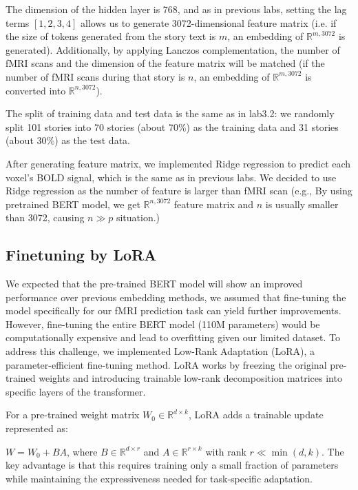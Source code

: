 \documentclass[12pt,letterpaper]{article}
\begin{document}
The dimension of the hidden layer is 768, and as in previous labs, setting the lag terms $[1,2,3,4]$ allows us to generate 3072-dimensional feature matrix (i.e. if the size of tokens generated from the story text is $m$, an embedding of $\mathbb{R}^{m, 3072}$ is generated). Additionally, by applying Lanczos complementation, the number of fMRI scans and the dimension of the feature matrix will be matched (if the number of fMRI scans during that story is $n$, an embedding of $\mathbb{R}^{m, 3072}$ is converted into $\mathbb{R}^{n, 3072}$).

The split of training data and test data is the same as in lab3.2: we randomly split 101 stories into 70 stories (about 70\%) as the training data and 31 stories (about 30\%) as the test data.

After generating feature matrix, we implemented Ridge regression to predict each voxel's BOLD signal, which is the same as in previous labs. We decided to use Ridge regression as the number of feature is larger than fMRI scan (e.g., By using pretrained BERT model, we get $\mathbb{R}^{n, 3072}$ feature matrix and $n$ is usually smaller than 3072, causing $n \gg p$ situation.) 

\subsection{Finetuning by LoRA}

We expected that the pre-trained BERT model will show an improved performance over previous embedding methods, we assumed that fine-tuning the model specifically for our fMRI prediction task can yield further improvements. However, fine-tuning the entire BERT model (110M parameters) would be computationally expensive and lead to overfitting given our limited dataset.
To address this challenge, we implemented Low-Rank Adaptation (LoRA), a parameter-efficient fine-tuning method. LoRA works by freezing the original pre-trained weights and introducing trainable low-rank decomposition matrices into specific layers of the transformer. 

For a pre-trained weight matrix $W_0 \in \mathbb{R}^{d \times k}$, LoRA adds a trainable update represented as:

$W=W_0+BA$, where $B \in \mathbb{R}^{d \times r}$ and $A \in \mathbb{R}^{r \times k}$ with rank $r \ll \min(d,k)$. The key advantage is that this requires training only a small fraction of parameters while maintaining the expressiveness needed for task-specific adaptation.
\end{document}
